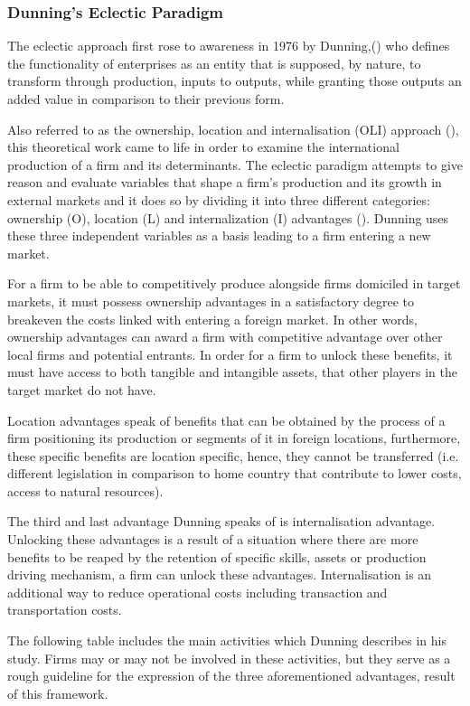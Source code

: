 \documentclass[11pt,a4paper]{article}
\begin{document}
{{\subsubsection{Dunning's Eclectic Paradigm}
The eclectic approach first rose to awareness in 1976 by Dunning,(\cite{eclectic_paradigm_dunning_extension}) who defines the functionality of enterprises as an entity that is supposed, by nature, to transform through production, inputs to outputs, while granting those outputs an added value in comparison to their previous form. \par
Also referred to as the ownership, location and internalisation (OLI) approach (\cite{eclectic_paradigm_dunning}), this theoretical work came to life in order to examine the international production of a firm and its determinants. The eclectic paradigm attempts to give reason and evaluate variables that shape a firm's production and its growth in external markets and it does so by dividing it into three different categories: ownership (O), location (L) and internalization (I) advantages (\cite{Dunning_moremore}). Dunning uses these three independent variables as a basis leading to a firm entering a new market. \par
For a firm to be able to competitively produce alongside firms domiciled in target markets, it must possess ownership advantages in a satisfactory degree to breakeven the costs linked with entering a foreign market. In other words, ownership advantages can award a firm with competitive advantage over other local firms and potential entrants. In order for a firm to unlock these benefits, it must have access to both tangible and intangible assets, that other players in the target market do not have.  \par
Location advantages speak of benefits that can be obtained by the process of a firm positioning its production or segments of it in foreign locations, furthermore, these specific benefits are location specific, hence, they cannot be transferred (i.e. different legislation in comparison to home country that contribute to lower costs, access to natural resources). \par
The third and last advantage Dunning speaks of is internalisation advantage. Unlocking these advantages is a result of a situation where there are more benefits to be reaped by the retention of specific skills, assets or production driving mechanism, a firm can unlock these advantages. Internalisation is an additional way to reduce operational costs including transaction and transportation costs. \par
The following table includes the main activities which Dunning describes in his study. Firms may or may not be involved in these activities, but they serve as a rough guideline for the expression of the three aforementioned advantages, result of this framework. 

}}
\end{document}
